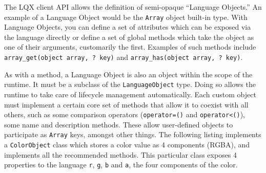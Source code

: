 \documentclass[]{article}
\newcommand{\ModLang}{LQX }
\begin{document}
  The \ModLang client API allows the definition of semi-opaque ``Language Objects.'' An example
  of a Language Object would be the {\tt Array} object built-in type. With Language Objects,
  you can define a set of attributes which can be exposed via the language directly or define
  a set of global methods which take the object as one of their arguments, customarily the first.
  Examples of such methods include {\tt array\_get(object array, ? key)} and 
  {\tt array\_has(object array, ? key)}.
  
  As with a method, a Language Object is also an object within the scope of the runtime. It
  must be a subclass of the {\tt LanguageObject} type. Doing so allows the runtime to take care
  of lifecycle management automatically. Each custom object must implement a certain core
  set of methods that allow it to coexist with all others, such as some comparison 
  operators ({\tt operator=()} and {\tt operator<()}), some name and description methods.
  These allow user-defined objects to participate as {\tt Array} keys, amongst other things.
  The following listing implements a {\tt ColorObject} class which stores a color value
  as 4 components (RGBA), and implements all the recommended methods. This particular class 
  exposes 4 properties to the language {\tt r}, {\tt g}, {\tt b} and {\tt a},
  the four components of the color. 
  
\end{document}
